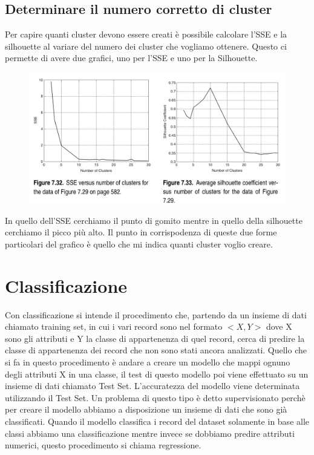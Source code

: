 \documentclass[14pt]{extreport}
\begin{document}
\section{Determinare il numero corretto di cluster}

Per capire quanti cluster devono essere creati è possibile calcolare l'SSE e la silhouette al variare del numero dei cluster che vogliamo ottenere.
Questo ci permette di avere due grafici, uno per l'SSE e uno per la Silhouette.

\begin{figure}[H]
\centering
  \includegraphics[width=\linewidth]{Knee.png}
\end{figure}

In quello dell'SSE cerchiamo il punto di gomito mentre in quello della silhouette cerchiamo il picco più alto. Il punto in corrispodenza di queste due forme particolari del grafico è quello che mi indica quanti cluster voglio creare.

\chapter{Classificazione}
Con classificazione si intende il procedimento che, partendo da un insieme di dati chiamato training set, in cui i vari record sono nel formato $<X, Y>$ dove X sono gli attributi e Y la classe di appartenenza di quel record, cerca di predire la classe di appartenenza dei record che non sono stati ancora analizzati.
Quello che si fa in questo procedimento è andare a creare un modello che mappi ognuno degli attributi X in una classe, il test di questo modello poi viene effettuato su un insieme di dati chiamato Test Set. L'accuratezza del modello viene determinata utilizzando il Test Set.
Un problema di questo tipo è detto supervisionato perchè per creare il modello abbiamo a disposizione un insieme di dati che sono già classificati. 
Quando il modello classifica i record del dataset solamente in base alle classi abbiamo una classificazione mentre invece se dobbiamo predire attributi numerici, questo procedimento si chiama regressione.
\end{document}
